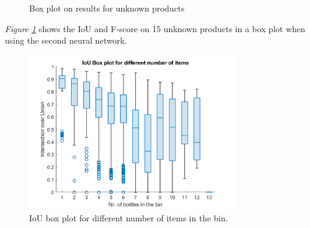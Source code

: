 \clearpage

\begin{figure}[h]
    \centering
    \hfill
    
    \caption{Box plot on results for unknown products}
    \label{fig:v2unknowniou}
\end{figure}

\textit{Figure \ref{fig:v2unknowniou}} shows the IoU and F-score on 15 unknown products in a box plot when using the second neural network.

\begin{figure}[h]
    \centering
    \includegraphics[width=0.8\textwidth]{graphics/results/v2boxplotBottles.png}
    \caption{IoU box plot for different number of items in the bin.}
    \label{fig:v2bottles}
\end{figure}

